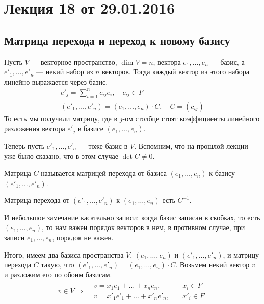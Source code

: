 


\renewcommand{\phi}{\varphi}
\section{Лекция 18 от 29.01.2016}

\subsection{Матрица перехода и переход к новому базису}
Пусть $V$ --- векторное пространство, $\dim V = n$, вектора $e_1, \ldots, e_n$ --- базис, а $e'_1, \ldots, e'_n$ --- некий набор из $n$ векторов. Тогда каждый вектор из этого набора линейно выражается через базис.
\begin{gather*}
e'_j = \sum_{i = 1}^{n} c_{ij}e_i, \quad c_{ij} \in F \\
(e'_1, \ldots, e'_n) = (e_1, \ldots, e_n) \cdot C, \quad C = (c_{ij})
\end{gather*}
То есть мы получили матрицу, где в $j$-ом столбце стоят коэффициенты линейного разложения вектора $e'_j$ в базисе $(e_1, \ldots, e_n)$.

Теперь пусть $e'_1, \ldots, e'_n$ --- тоже базис в $V$. Вспомним, что на прошлой лекции уже было сказано, что в этом случае $\det C \neq 0$.

\begin{Def}
Матрица $C$ называется матрицей перехода от базиса $(e_1, \ldots, e_n)$ к базису $(e'_1, \ldots, e'_n)$.
\end{Def}

\begin{Comment}
Матрица перехода от $(e'_1, \ldots, e'_n)$ к $(e_1, \ldots, e_n)$ есть $C^{-1}$.
\end{Comment}

И небольшое замечание касательно записи: когда базис записан в скобках, то есть $(e_1, \ldots, e_n)$, то нам важен порядок векторов в нем, в противном случае, при записи $e_1, \ldots, e_n$, порядок не важен.

Итого, имеем два базиса пространства $V$, $(e_1, \ldots, e_n)$ и $(e'_1, \ldots, e'_n)$, и матрицу перехода $C$ такую, что $(e'_1, \ldots, e'_n) = (e_1, \ldots, e_n) \cdot C$. Возьмем некий вектор $v$ и разложим его по обоим базисам.
\begin{gather*}
v \in V \Rightarrow 
\begin{aligned}
& v = x_1e_1 + \ldots + x_ne_n, \quad & x_i \in F \\
& v = x'_1e'_1 + \ldots + x'_ne'_n, \quad & x'_i \in F
\end{aligned}
\end{gather*}

